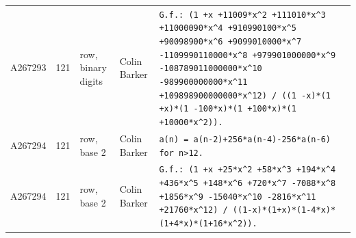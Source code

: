 \documentclass[11pt]{article}
\theoremstyle{definition}
\theoremstyle{remark}
\begin{document}
{\begin{longtable}{p{1.3cm}p{0.7cm}p{2.4cm}p{2.3cm}p{7.3cm}}
A267293 & 121 & row, binary digits & Colin Barker & \texttt{G.f.: \allowbreak{}(1 \allowbreak{}+\allowbreak{}x \allowbreak{}+\allowbreak{}11009*\allowbreak{}x\^{}2 \allowbreak{}+\allowbreak{}111010*\allowbreak{}x\^{}3 \allowbreak{}+\allowbreak{}11000090*\allowbreak{}x\^{}4 \allowbreak{}+\allowbreak{}910990100*\allowbreak{}x\^{}5 \allowbreak{}+\allowbreak{}90098900*\allowbreak{}x\^{}6 \allowbreak{}+\allowbreak{}9099010000*\allowbreak{}x\^{}7 \allowbreak{}-\allowbreak{}1109990110000*\allowbreak{}x\^{}8 \allowbreak{}+\allowbreak{}979901000000*\allowbreak{}x\^{}9 \allowbreak{}-\allowbreak{}108789011000000*\allowbreak{}x\^{}10 \allowbreak{}-\allowbreak{}989900000000*\allowbreak{}x\^{}11 \allowbreak{}+\allowbreak{}109898900000000*\allowbreak{}x\^{}12)\allowbreak{} \allowbreak{}/\allowbreak{} \allowbreak{}((1 \allowbreak{}-\allowbreak{}x)\allowbreak{}*\allowbreak{}(1 \allowbreak{}+\allowbreak{}x)\allowbreak{}*\allowbreak{}(1 \allowbreak{}-\allowbreak{}100*\allowbreak{}x)\allowbreak{}*\allowbreak{}(1 \allowbreak{}+\allowbreak{}100*\allowbreak{}x)\allowbreak{}*\allowbreak{}(1 \allowbreak{}+\allowbreak{}10000*\allowbreak{}x\^{}2)\allowbreak{})\allowbreak{}.} \\
A267294 & 121 & row, base 2 & Colin Barker & \texttt{a(n)\allowbreak{} \allowbreak{}=\allowbreak{} \allowbreak{}a(n-\allowbreak{}2)\allowbreak{}+\allowbreak{}256*\allowbreak{}a(n-\allowbreak{}4)\allowbreak{}-\allowbreak{}256*\allowbreak{}a(n-\allowbreak{}6)\allowbreak{} \allowbreak{}for \allowbreak{}n>12.} \\
A267294 & 121 & row, base 2 & Colin Barker & \texttt{G.f.: \allowbreak{}(1 \allowbreak{}+\allowbreak{}x \allowbreak{}+\allowbreak{}25*\allowbreak{}x\^{}2 \allowbreak{}+\allowbreak{}58*\allowbreak{}x\^{}3 \allowbreak{}+\allowbreak{}194*\allowbreak{}x\^{}4 \allowbreak{}+\allowbreak{}436*\allowbreak{}x\^{}5 \allowbreak{}+\allowbreak{}148*\allowbreak{}x\^{}6 \allowbreak{}+\allowbreak{}720*\allowbreak{}x\^{}7 \allowbreak{}-\allowbreak{}7088*\allowbreak{}x\^{}8 \allowbreak{}+\allowbreak{}1856*\allowbreak{}x\^{}9 \allowbreak{}-\allowbreak{}15040*\allowbreak{}x\^{}10 \allowbreak{}-\allowbreak{}2816*\allowbreak{}x\^{}11 \allowbreak{}+\allowbreak{}21760*\allowbreak{}x\^{}12)\allowbreak{} \allowbreak{}/\allowbreak{} \allowbreak{}((1-\allowbreak{}x)\allowbreak{}*\allowbreak{}(1+\allowbreak{}x)\allowbreak{}*\allowbreak{}(1-\allowbreak{}4*\allowbreak{}x)\allowbreak{}*\allowbreak{}(1+\allowbreak{}4*\allowbreak{}x)\allowbreak{}*\allowbreak{}(1+\allowbreak{}16*\allowbreak{}x\^{}2)\allowbreak{})\allowbreak{}.} \\

\end{longtable}}
\end{document}
